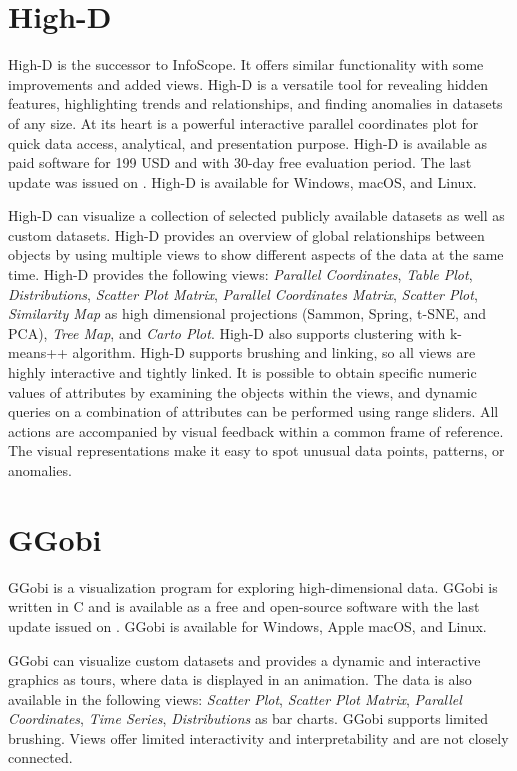 \section{High-D}

High-D \parencite{HighD} is the successor to InfoScope. It offers
similar functionality with some improvements and added views. High-D
is a versatile tool for revealing hidden features, highlighting trends
and relationships, and finding anomalies in datasets of any size. At
its heart is a powerful interactive parallel coordinates plot for
quick data access, analytical, and presentation purpose. High-D is
available as paid software for 199 USD and with 30-day free evaluation
period. The last update was issued on . High-D is
available for Windows, macOS, and Linux.


High-D can visualize a collection of selected publicly available
datasets as well as custom datasets. High-D provides an overview of
global relationships between objects by using multiple views to show
different aspects of the data at the same time. High-D provides the
following views: \emph{Parallel Coordinates}, \emph{Table Plot},
\emph{Distributions}, \emph{Scatter Plot Matrix}, \emph{Parallel
Coordinates Matrix}, \emph{Scatter Plot}, \emph{Similarity Map} as
high dimensional projections (Sammon, Spring, t-SNE, and PCA),
\emph{Tree Map}, and \emph{Carto Plot}. High-D also supports
clustering with k-means++ algorithm. High-D supports brushing and
linking, so all views are highly interactive and tightly linked. It is
possible to obtain specific numeric values of attributes by examining
the objects within the views, and dynamic queries on a combination of
attributes can be performed using range sliders. All actions are
accompanied by visual feedback within a common frame of reference. The
visual representations make it easy to spot unusual data points,
patterns, or anomalies.




\section{GGobi}

GGobi \parencite{cook2007interactive} is a visualization program for
exploring high-dimensional data. GGobi is written in C and is
available as a free and open-source software with the last update
issued on . GGobi is available for Windows, Apple macOS,
and Linux.

GGobi can visualize custom datasets and provides a dynamic and
interactive graphics as tours, where data is displayed in an
animation. The data is also available in the following views:
\emph{Scatter Plot}, \emph{Scatter Plot Matrix}, \emph{Parallel
Coordinates}, \emph{Time Series}, \emph{Distributions} as bar
charts. GGobi supports limited brushing. Views offer limited
interactivity and interpretability and are not closely connected.


